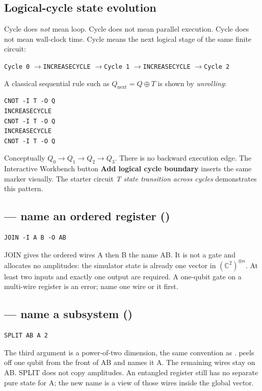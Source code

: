 \subsection{Logical-cycle state evolution}
\hypertarget{cycle-based-state-evolution}{}

Cycle does \emph{not} mean loop. Cycle does not mean parallel execution. Cycle
does not mean wall-clock time. Cycle means the next logical stage of the same
finite circuit:

\begin{center}
\texttt{Cycle 0} \quad$\rightarrow$\quad \texttt{INCREASECYCLE}
\quad$\rightarrow$\quad \texttt{Cycle 1}
\quad$\rightarrow$\quad \texttt{INCREASECYCLE}
\quad$\rightarrow$\quad \texttt{Cycle 2}
\end{center}

A classical sequential rule such as $Q_{\mathrm{next}}=Q\oplus T$ is shown by
\emph{unrolling}:
\begin{lstlisting}
CNOT -I T -O Q
INCREASECYCLE
CNOT -I T -O Q
INCREASECYCLE
CNOT -I T -O Q
\end{lstlisting}
Conceptually $Q_0\to Q_1\to Q_2\to Q_3$. There is no backward execution edge.
The Interactive Workbench button \textbf{Add logical cycle boundary} inserts the same
marker visually. The starter circuit \emph{T state transition across cycles}
demonstrates this pattern.

\subsection{ --- name an ordered register (\implemented)}

\begin{lstlisting}
JOIN -I A B -O AB
\end{lstlisting}
JOIN gives the ordered wires A then B the name AB. It is not a gate and
allocates no amplitudes: the simulator state is already one vector in
$(\mathbb{C}^2)^{\otimes n}$. At least two inputs and exactly one output are
required. A one-qubit gate on a multi-wire register is an error; name one wire
or  it first.

\subsection{ --- name a subsystem (\implemented)}

\begin{lstlisting}
SPLIT AB A 2
\end{lstlisting}
The third argument is a power-of-two dimension, the same convention as
.  peels off one qubit from the front of AB and names it A.
The remaining wires stay on AB. SPLIT does not copy amplitudes. An entangled
register still has no separate pure state for A; the new name is a view of
those wires inside the global vector.

